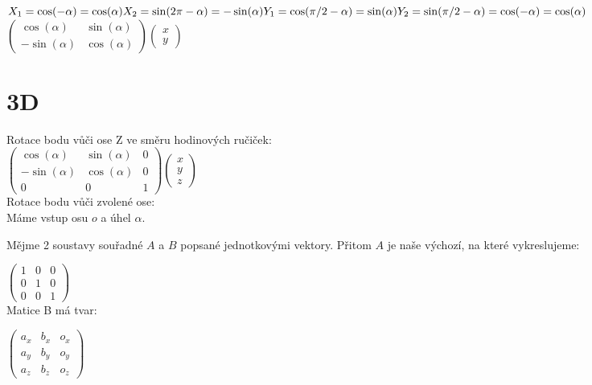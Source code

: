 \documentclass[a4paper,12pt]{book}
\begin{document}
$X_1 = \cos(-\alpha) = \cos(\alpha)\\
X_2 = \sin(2\pi-\alpha) = -\sin(\alpha)\\
Y_1 = \cos(\pi/2 - \alpha) = \sin(\alpha)\\
Y_2 = \sin(\pi/2 - \alpha) = \cos(-\alpha) = \cos(\alpha)
$\\



$\begin{pmatrix}
\cos(\alpha) & \sin(\alpha)\\
-\sin(\alpha) & \cos(\alpha)
\end{pmatrix}\begin{pmatrix}x\\y\end{pmatrix}$



\section{3D}

Rotace bodu vůči ose Z ve směru hodinových ručiček:\\
$\begin{pmatrix}
\cos(\alpha) & \sin(\alpha) & 0\\
-\sin(\alpha) & \cos(\alpha) & 0\\
0 & 0 & 1
\end{pmatrix}\begin{pmatrix}x\\y\\z\end{pmatrix}$\\

Rotace bodu vůči zvolené ose:\\

Máme vstup osu $o$ a úhel $\alpha$. 

Mějme 2 soustavy souřadné $A$ a $B$ popsané jednotkovými vektory. Přitom $A$ je naše výchozí, na které vykreslujeme:

$\begin{pmatrix}
1 & 0 & 0\\
0 & 1 & 0\\
0 & 0 & 1
\end{pmatrix}$\\

Matice B má tvar:

$\begin{pmatrix}
a_x& b_x& o_x\\
a_y & b_y& o_y\\
a_z & b_z & o_z
\end{pmatrix}$\\
\end{document}
